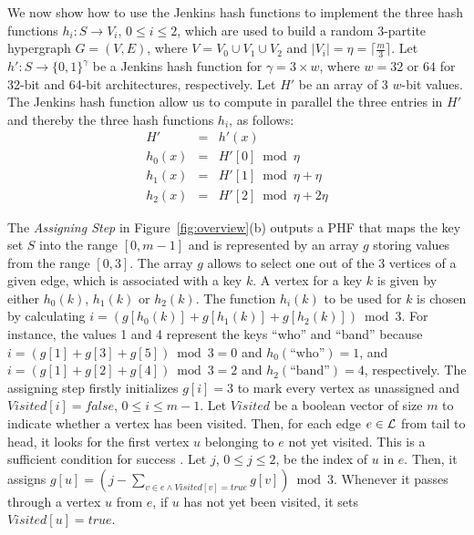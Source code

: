 We now show how to use the Jenkins hash functions \cite{j97}
to implement the three hash functions $h_i: S \to V_i$, $0\le i \le 2$, which are used to build a random $3$-partite hypergraph
$G=(V,E)$,
where $V= V_0 \cup V_1 \cup V_2$ and $|V_i| = \eta = \lceil \frac{m}{3} \rceil$.
Let $h':S \to \{0,1\}^\gamma$ be a Jenkins hash function
for $\gamma = 3 \times w$, where
$w = 32 \text{ or } 64$ for
32-bit and 64-bit architectures, respectively.
Let $H'$ be an array of 3 $w$-bit values.
The Jenkins hash function
allow us to compute in parallel the three entries in $H'$
and thereby the three hash functions $h_i$, as follows:
\begin{eqnarray}
 H' &=& h'(x) \nonumber \\
 h_0(x) &=& H'[0] \bmod \eta \nonumber \\
 h_1(x) &=& H'[1] \bmod \eta + \eta \nonumber \\
 h_2(x) &=& H'[2] \bmod \eta + 2\eta
\end{eqnarray}

The {\em Assigning Step} in Figure~\ref{fig:overview}(b) outputs
a PHF that maps the key set $S$ into the range $[0,m-1]$ and is represented by
an array $g$ storing values from the range $[0,3]$.
The array $g$ allows to select one out of the $3$
vertices of a given edge, which is associated with a
key $k$.
A vertex for a key $k$ is given
by either $h_0(k)$, $h_1(k)$ or $h_2(k)$.
The function $h_i(k)$
to be used for $k$ is chosen by calculating $i = (g[h_0(k)] + g[h_1(k)] + g[h_2(k)]) \bmod 3$.
For instance,
the values 1 and 4 represent the keys ``who'' and ``band''
because $i = (g[1] + g[3] + g[5]) \bmod 3 = 0$ and $h_0(\text{``who''}) = 1$,
and $i = (g[1] + g[2] + g[4]) \bmod 3 = 2$ and $h_2(\text{``band''}) = 4$, respectively.
The assigning step firstly initializes $g[i]=3$
to mark every vertex as unassigned
and
$\mathit{Visited}[i]=\mathit{false}$, $0\leq i \leq m-1$.
Let $\mathit{Visited}$ be a boolean vector of size $m$
to indicate whether a vertex has been visited.
Then, for each edge $e \in \cal L$ from tail to head,
it looks for the first
vertex $u$ belonging to $e$ not yet visited.
This is a sufficient condition for success \cite{b08,bpz07,mwhc96}.
Let $j$, $0 \leq j \leq 2$, be the index of $u$ in $e$.
Then, it assigns $g[u]=(j-\sum_{v \in e \wedge \mathit{Visited}[v] = true} g[v]) \bmod 3$.
Whenever it passes through a vertex $u$ from $e$,
if $u$ has not yet been visited,
it sets $\mathit{Visited}[u] = true$.

